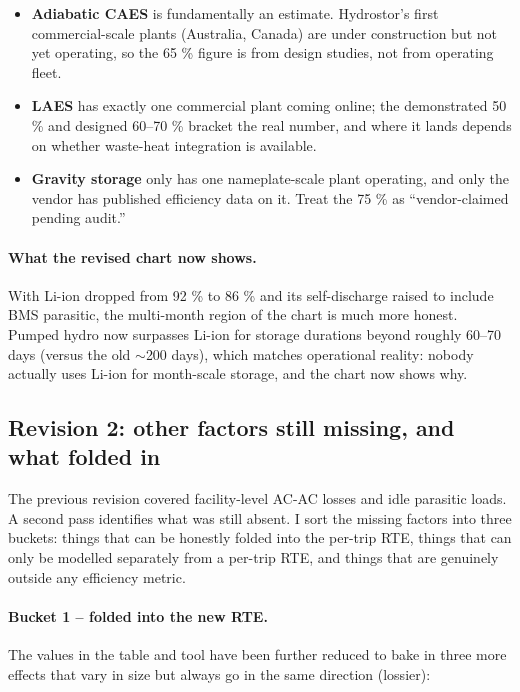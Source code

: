 \begin{itemize}
    \item \textbf{Adiabatic CAES} is fundamentally an estimate.
    Hydrostor's first commercial-scale plants (Australia, Canada)
    are under construction but not yet operating, so the 65 \% figure
    is from design studies, not from operating fleet.
    \item \textbf{LAES} has exactly one commercial plant coming
    online; the demonstrated 50 \% and designed 60--70 \% bracket the
    real number, and where it lands depends on whether waste-heat
    integration is available.
    \item \textbf{Gravity storage} only has one nameplate-scale plant
    operating, and only the vendor has published efficiency data
    on it. Treat the 75 \% as ``vendor-claimed pending audit.''
\end{itemize}

\paragraph{What the revised chart now shows.}
With Li-ion dropped from 92 \% to 86 \% and its self-discharge raised
to include BMS parasitic, the multi-month region of the chart is
much more honest. Pumped hydro now surpasses Li-ion for storage
durations beyond roughly 60--70 days (versus the old $\sim$200 days),
which matches operational reality: nobody actually uses Li-ion for
month-scale storage, and the chart now shows why.

\subsection*{Revision 2: other factors still missing, and what folded in}

The previous revision covered facility-level AC-AC losses and idle
parasitic loads. A second pass identifies what was still absent. I
sort the missing factors into three buckets: things that can be
honestly folded into the per-trip RTE, things that can only be
modelled separately from a per-trip RTE, and things that are
genuinely outside any efficiency metric.

\paragraph{Bucket 1 -- folded into the new RTE.}
The values in the table and tool have been further reduced to bake
in three more effects that vary in size but always go in the same
direction (lossier):

